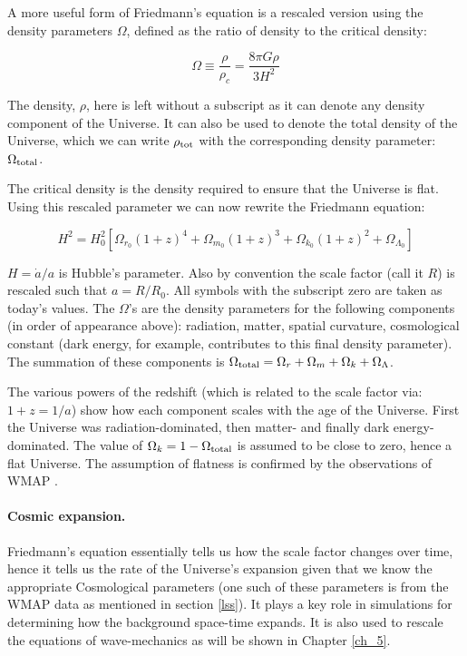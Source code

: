 A more useful form of Friedmann's equation is a rescaled version using the density parameters $\Omega$, defined as the ratio of density to the critical density:

\begin{equation}
\Omega \equiv \frac{\rho}{\rho_c} = \frac{8\pi G\rho}{3H^2}
\end{equation}

\noindent The density, $\rho$, here is left without a subscript as it can denote any density component of the Universe. It can also be used to denote the total density of the Universe, which we can write $\rho_{\rm tot}$ with the corresponding density parameter: $\Omega_{\rm total}$.

The critical density is the density required to ensure that the Universe is flat. Using this rescaled parameter we can now rewrite the Friedmann equation:

\begin{equation}
\label{eqn_fdmn}
H^2 = H_0^2 \left[\Omega_{r_0} (1 + z)^4 + \Omega_{m_0} (1 + z)^3 + \Omega_{k_0}(1 + z)^2 + \Omega_{\Lambda_0} \right]
\end{equation}

\noindent $H = \dot a/a$ is Hubble's parameter. Also by convention the scale factor (call it $R$) is rescaled such that $a = R/R_0$. All symbols with the subscript zero are taken as today's values. The $\Omega$'s are the density parameters for the following components (in order of appearance above): radiation, matter, spatial curvature, cosmological constant (dark energy, for example, contributes to this final density parameter). The summation of these components is $\Omega_{\rm total} = \Omega_{r} + \Omega_{m} + \Omega_{k} + \Omega_{\Lambda}$.

The various powers of the redshift (which is related to the scale factor via: $1 + z = 1/a$) show how each component scales with the age of the Universe. First the Universe was radiation-dominated, then matter- and finally dark energy-dominated. The value of $\Omega_{k} = 1 - \Omega_{\rm total}$ is assumed to be close to zero, hence a flat Universe. The assumption of flatness is confirmed by the observations of WMAP \citep{bib_wmap}.

\paragraph{Cosmic expansion.}Friedmann's equation essentially tells us how the scale factor changes over time, hence it tells us the rate of the Universe's expansion given that we know the appropriate Cosmological parameters (one such of these parameters is from the WMAP data as mentioned in section \ref{lss}). It plays a key role in simulations for determining how the background space-time expands. It is also used to rescale the equations of wave-mechanics as will be shown in Chapter \ref{ch_5}.

